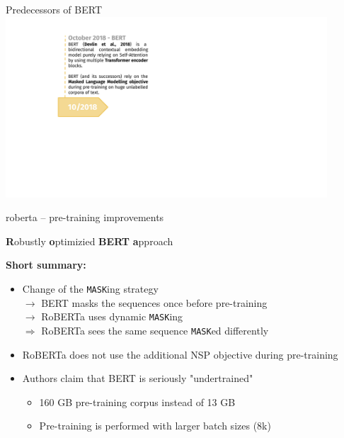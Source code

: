 \begin{frame}[noframenumbering]{Predecessors of BERT}
\hbox{\hspace{-0.5em} \includegraphics[width=12cm,page=4]{figure/transfer_learning_timeline3_nlp.pdf}}
\end{frame}


\begin{frame}{roberta -- pre-training improvements}

\vfill

\textbf{R}obustly \textbf{o}ptimizied \textbf{BERT} \textbf{a}pproach \\ \medskip\medskip

\textbf{Short summary:}

	\begin{itemize}
		\item Change of the \texttt{MASK}ing strategy  \\
					$\rightarrow$ BERT masks the sequences once before pre-training  \\
					$\rightarrow$ RoBERTa uses dynamic \texttt{MASK}ing  \\
					$\Rightarrow$ RoBERTa sees the same sequence \texttt{MASK}ed differently
		\item RoBERTa does not use the additional NSP objective during pre-training
		\item Authors claim that BERT is seriously "undertrained"
			\begin{itemize}
				\item 160 GB pre-training corpus instead of 13 GB
				\item Pre-training is performed with larger batch sizes (8k)
			\end{itemize}
	\end{itemize}
	
\vfill

\end{frame}

